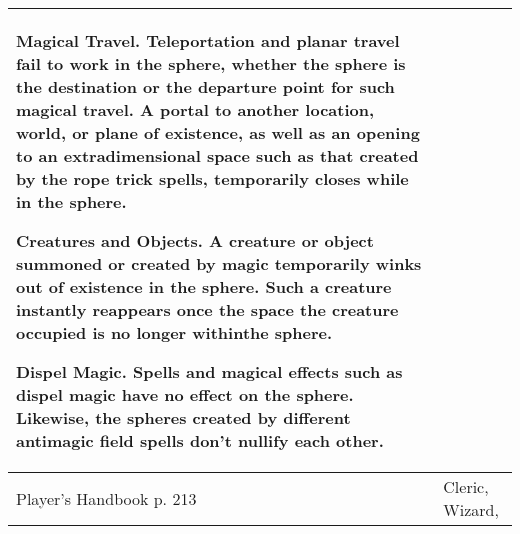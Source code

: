 \documentclass[11pt]{report}
\begin{document}
\begin{table}[H]
\begin{tabular}{||p{6cm}|p{6cm}||}
{Magical Travel. 
Teleportation and planar travel fail to work in the sphere, whether the sphere is the destination or the departure point for such magical travel. A portal to another location, world, or plane of existence, as well as an opening to an extradimensional space such as that created by the rope trick spells, temporarily closes while in the sphere. 

Creatures and Objects. 
A creature or object summoned or created by magic temporarily winks out of existence in the sphere. Such a creature instantly reappears once the space the creature occupied is no longer withinthe sphere. 

Dispel Magic. 
Spells and magical effects such as dispel magic have no effect on the sphere. Likewise, the spheres created by different antimagic field spells don’t nullify each other.}\\ \hline
Player's Handbook p. 213 & Cleric, Wizard, \\ \hline\hline
	\end{tabular}
\end{table}
\end{document}
